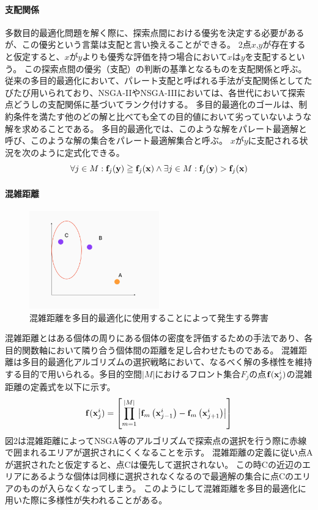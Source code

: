 \documentclass{rentai-chugoku}
\begin{document}
\paragraph{支配関係}
多数目的最適化問題を解く際に、探索点間における優劣を決定する必要があるが、この優劣という言葉は支配と言い換えることができる。
2点$x$,$y$が存在すると仮定すると、$x$が$y$よりも優秀な評価を持つ場合において$x$は$y$を支配するという。
この探索点間の優劣（支配）の判断の基準となるものを支配関係と呼ぶ。
従来の多目的最適化において、パレート支配と呼ばれる手法が支配関係としてたびたび用いられており、NSGA-IIやNSGA-IIIにおいては、各世代において探索点どうしの支配関係に基づいてランク付けする。
多目的最適化のゴールは、制約条件を満たす他のどの解と比べても全ての目的値において劣っていないような解を求めることである。
多目的最適化では、このような解をパレート最適解と呼び、このような解の集合をパレート最適解集合と呼ぶ。
$x$が$y$に支配される状況を次のように定式化できる。
\begin{equation}
\forall j \in {M}:{\bf f}_j({\bf y}) \geqq {\bf f}_j({\bf x}) \land \exists j \in M:{\bf f}_j({\bf y}) > {\bf f}_j({\bf x})
\end{equation}



\paragraph{混雑距離}
\begin{figure}[b]
\begin{center}
\includegraphics[width=0.5\textwidth]{noSelected.png}
\end{center}
\label{noSelected}
\caption{混雑距離を多目的最適化に使用することによって発生する弊害}
\end{figure}
混雑距離とはある個体の周りにある個体の密度を評価するための手法であり、各目的関数軸において隣り合う個体間の距離を足し合わせたものである。
混雑距離は多目的最適化アルゴリズムの選択戦略において、なるべく解の多様性を維持する目的で用いられる。多目的空間$|M|$におけるフロント集合$F_j$の点${\bf f}({\bf x}_{j}^i)$の混雑距離の定義式を以下に示す。
\begin{equation}
    {\bf f}({\bf x}_{j}^i)=\left[\prod_{m=1}^{|M|} \left|{\bf f}_m\left({\bf x}_{j-1}^i\right)-{\bf f}_m\left({\bf x}_{j+1}^i\right)\right|\right]
\end{equation}
図2は混雑距離によってNSGA等のアルゴリズムで探索点の選択を行う際に赤線で囲まれるエリアが選択されにくくなることを示す。
混雑距離の定義に従い点Aが選択されたと仮定すると、点Cは優先して選択されない。
この時Cの近辺のエリアにあるような個体は同様に選択されなくなるので最適解の集合に点Cのエリアのものが入らなくなってしまう。
このようにして混雑距離を多目的最適化に用いた際に多様性が失われることがある。
\end{document}
